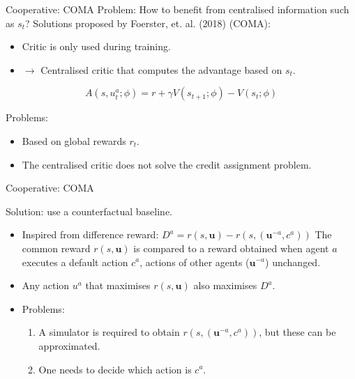 \documentclass{beamer}
\begin{document}
\begin{frame}{Cooperative: COMA}
Problem: How to benefit from centralised information such as $s_t$?
\vfill
Solutions proposed by Foerster, et. al. (2018) (COMA):
\begin{itemize}
    \item Critic is only used during training.
    \item $\rightarrow$ Centralised critic that computes the advantage based on $s_t$.
\end{itemize}

\begin{equation*}
    A(s,u^a_t; \phi) = r + \gamma V(s_{t+1}; \phi) - V(s_t; \phi)
\end{equation*}

\vfill

Problems: 
\begin{itemize}
    \item Based on global rewards $r_t$.
    \item The centralised critic does not solve the credit assignment problem.
\end{itemize}
\vfill

\end{frame}
\begin{frame}{Cooperative: COMA}

Solution: use a counterfactual baseline.
\vfill
\begin{itemize}
    \item Inspired from difference reward: 
    \vfill
    $D^a=r(s, \bm{u}) - r(s, (\bm{u}^{-a}, c^a))$
    \vfill
    The common reward $r(s, \bm{u})$ is compared to a reward obtained when agent $a$ executes a default action $c^a$, actions of other agents ($\bm{u}^{-a}$) unchanged.
    \vfill
    \item Any action $u^a$ that maximises $r(s, \bm{u})$ also maximises $D^a$.
    \vfill
    \item Problems:
    \begin{enumerate}
        \item A simulator is required to obtain $r(s, (\bm{u}^{-a}, c^a))$, but these can be approximated.
        \item One needs to decide which action is $c^a$.
    \end{enumerate}
\end{itemize}

\end{frame}
\end{document}
